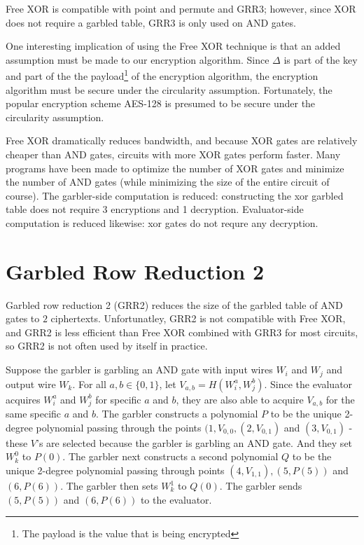Free XOR is compatible with point and permute and GRR3; however, since XOR does not require a garbled table, GRR3 is only used on AND gates.

One interesting implication of using the Free XOR technique is that an added assumption must be made to our encryption algorithm.
Since $\Delta$ is part of the key and part of the the payload\footnote{The payload is the value that is being encrypted} of the encryption algorithm, the encryption algorithm must be secure under the circularity assumption.
Fortunately, the popular encryption scheme AES-128 is presumed to be secure under the circularity assumption.

Free XOR dramatically reduces bandwidth, and because XOR gates are relatively cheaper than AND gates, circuits with more XOR gates perform faster.
Many programs have been made to optimize the number of XOR gates and minimize the number of AND gates (while minimizing the size of the entire circuit of course).
The garbler-side computation is reduced: constructing the xor garbled table does not require 3 encryptions and 1 decryption.
Evaluator-side computation is reduced likewise: xor gates do not requre any decryption.

\section{Garbled Row Reduction 2}
Garbled row reduction 2 (GRR2) reduces the size of the garbled table of AND gates to $2$ ciphertexts.
Unfortunatley, GRR2 is not compatible with Free XOR, and GRR2 is less efficient than Free XOR combined with GRR3 for most circuits, so GRR2 is not often used by itself in practice.

Suppose the garbler is garbling an AND gate with input wires $W_i$ and $W_j$ and output wire $W_k$.
For all $a,b \in \{0,1\}$, let $V_{a,b} = H(W_i^a, W_j^b)$.
Since the evaluator acquires $W_i^a$ and $W_j^b$ for specific $a$ and $b$, they are also able to acquire $V_{a,b}$ for the same specific $a$ and $b$.
The garbler constructs a polynomial $P$ to be the unique 2-degree polynomial passing through the points $(1, V_{0,0}, (2, V_{0,1})$ and $(3, V_{0,1})$ - these $V$'s are selected because the garbler is garbling an AND gate.
And they set $W_k^0$ to $P(0)$.
The garbler next constructs a second polynomial $Q$ to be the unique 2-degree polynomial passing through points $(4, V_{1,1}), (5, P(5))$ and  $(6, P(6))$.
The garbler then sets $W_k^1$ to $Q(0)$.
The garbler sends $(5, P(5))$ and $(6, P(6))$ to the evaluator.

